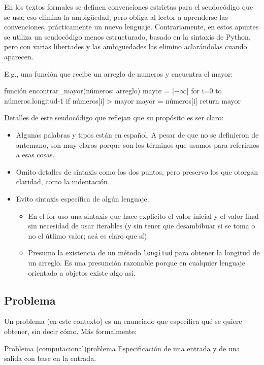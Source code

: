 En los textos formales se definen convenciones estrictas para el seudocódigo que se usa; eso elimina la ambigüedad, pero obliga al lector a aprenderse las convenciones, prácticamente un nuevo lenguaje. Contrariamente, en estos apuntes se utiliza un seudocódigo menos estructurado, basado en la sintaxis de Python, pero con varias libertades y las ambigüedades las elimino aclarándolas cuando aparecen.

E.g., una función que recibe un arreglo de numeros y encuentra el mayor:
\begin{pseudocode}
función encontrar_mayor(números: arreglo)
    mayor = |$-\infty$|
    for i=0 to números.longitud-1
        if números[i] > mayor
            mayor = números[i]
    return mayor
\end{pseudocode}
Detalles de este seudocódigo que reflejan que su propósito es ser claro:
\begin{itemize}
  \item Algunas palabras y tipos están en español. A pesar de que no se definieron de antemano, son muy claros porque son los términos que usamos para referirnos a esas cosas.
  \item Omito detalles de sintaxis como los dos puntos, pero preservo los que otorgan claridad, como la indentación.
  \item Evito sintaxis específica de algún lenguaje.
  \begin{itemize}
    \item En el for uso una sintaxis que hace explícito el valor inicial y el valor final sin necesidad de usar iterables (y sin tener que desambibuar si se toma o no el útlimo valor; acá es claro que sí)
    \item Presumo la existencia de un método \texttt{longitud} para obtener la longitud de un arreglo. Es una presunción razonable porque en cualquier lenguaje orientado a objetos existe algo así.
  \end{itemize}
\end{itemize}

\subsection{Problema}
\label{subsec:problema}

Un problema (en este contexto) es un enunciado que especifica qué se quiere obtener, sin decir cómo. Más formalmente:
\begin{definicion}{Problema (computacional)}{problema}
Especificación de una entrada y de una salida con base en la entrada.
\end{definicion}

